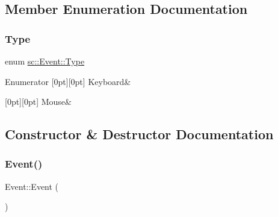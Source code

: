 \subsection{Member Enumeration Documentation}
\mbox{\label{classsc_1_1_event_a2aeb7e82d52a083b626e7baf3f81cc8a}} 
\subsubsection{\texorpdfstring{Type}{Type}}
{\footnotesize\ttfamily enum \mbox{\hyperlink{classsc_1_1_event_a2aeb7e82d52a083b626e7baf3f81cc8a}{sc\+::\+Event\+::\+Type}}\hspace{0.3cm}{\ttfamily [strong]}}

\begin{DoxyEnumFields}{Enumerator}
[0pt][0pt]{}\mbox{\label{classsc_1_1_event_a2aeb7e82d52a083b626e7baf3f81cc8aa6ce4d85a628a88bbdb3ac24a8e5a9c2e}} 
Keyboard&\\
\hline

[0pt][0pt]{}\mbox{\label{classsc_1_1_event_a2aeb7e82d52a083b626e7baf3f81cc8aaf2a47c6809d88e175dade0ef7b16aa13}} 
Mouse&\\
\hline

\end{DoxyEnumFields}


\subsection{Constructor \& Destructor Documentation}
\mbox{\label{classsc_1_1_event_a5a40dd4708297f7031e29b39e039ae10}} 
\subsubsection{\texorpdfstring{Event()}{Event()}}
{\footnotesize\ttfamily Event\+::\+Event (\begin{DoxyParamCaption}{ }\end{DoxyParamCaption})}

